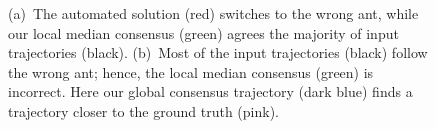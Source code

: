 \documentclass{llncs}
\begin{document}
\begin{figure}[tb]
    \center
    \caption{\label{fig:exall}\small
(a)~The automated solution (red) switches to the wrong ant, while our
local median consensus (green) agrees the majority of input
trajectories (black).
    (b)~Most of the input trajectories (black) follow the wrong ant;
hence, the local median consensus (green) is incorrect. Here our
global consensus trajectory (dark blue) finds a trajectory closer to
the ground truth (pink).
}
\end{figure}




%
\end{document}
